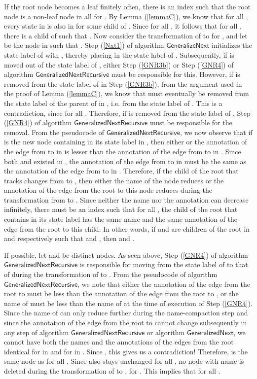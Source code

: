 \documentclass[3p]{elsarticle}
\newcommand{\algo}[1]{\ensuremath{\textsf{{#1}}}}
\begin{document}
If the root node becomes a leaf finitely often, there is an index  such that the root node is a non-leaf node in all  for .  By Lemma (\ref{lemmaC}), we know that for all ,
every state in  is also in  for some
child  of .  Since  for all , it follows that for all , there is a child  of 
such that .  Now consider the transformation
of  to  for , and let  be the node in
 such that .  Step (\ref{Nxt1}) of
algorithm \algo{GeneralizeNext} initializes the state label of 
with , thereby placing 
in the state label of .  Subsequently, if  is moved
out of the state label of , either Step (\ref{GNR3b}) or Step
(\ref{GNR4}) of algorithm \algo{GeneralizedNextRecursive} must be
responsible for this.  However, if  is removed from the
state label of  in Step (\ref{GNR3b}), from the argument used in
the proof of Lemma (\ref{lemmaC}), we know that  must
eventually be removed from the state label of the parent of  in
, i.e. from the state label of .  This is a
contradiction, since  for all .
Therefore, if  is removed from the state label of ,
Step (\ref{GNR4}) of algorithm \algo{GeneralizedNextRecursive} must be
responsible for the removal.  From the pseudocode of
\algo{GeneralizedNextRecursive}, we now observe that if  is
the new node containing  in its state label in ,
then either  or the
annotation of the edge from  to  in  is
lesser than the annotation of the edge from  to  in
.  Since both  and  existed in ,
the annotation of the edge from  to  in  must
be the same as the annotation of the edge from  to  in
.  Therefore, if the child of the root that tracks  changes
from  to , then either the name of the node reduces or
the annotation of the edge from the root to this node reduces during
the transformation from  to .  Since neither the name
nor the annotation can decrease infinitely, there must be an index
 such that for all , the child of the root that
contains  in its state label has the same name and the same
annotation of the edge from the root to this child.  In other words,
if  and  are children of the root in  and 
respectively such that  and , then  and
.

If possible, let  and  be distinct nodes.  As seen
above, Step (\ref{GNR4}) of algorithm \algo{GeneralizedNextRecursive}
is responsible for moving  from the state label of  to
that of  during the transformation of  to .
From the pseudocode of algorithm \algo{GeneralizedNextRecursive}, we
note that either the annotation of the edge from the root to 
must be less than the annotation of the edge from the root to ,
or the name of  must be less than the name of  at the
time of execution of Step (\ref{GNR4}).  Since the name of 
can only reduce further during the name-compaction step and since the
annotation of the edge from the root to  cannot change
subsequently in any step of algorithm \algo{GeneralizedNextRecursive}
or algorithm \algo{GeneralizedNext}, we cannot have both the names and
the annotations of the edges from the root identical for  in
 and for  in .  Since , this gives us
a contradiction!  Therefore,  is the same node as  for
all .  Since  also stays unchanged for all , no node with name  is deleted during the
transformation of  to , for .  This implies
that  for all .
\end{document}
